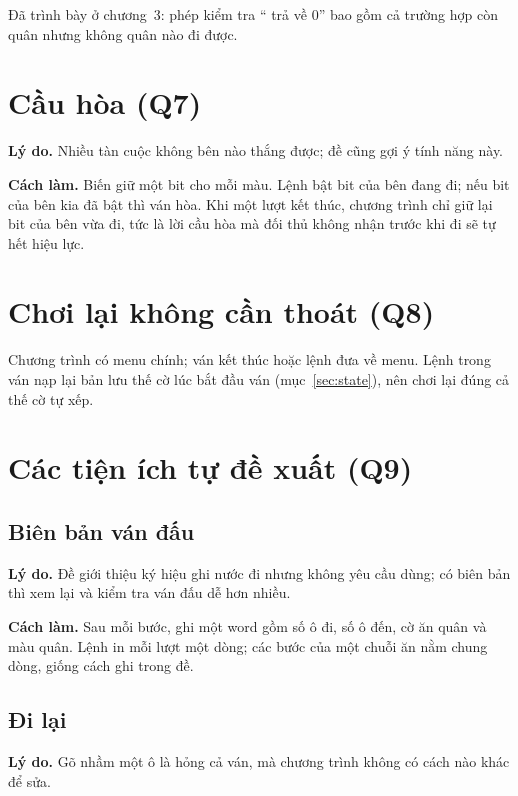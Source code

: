 Đã trình bày ở chương~3: phép kiểm tra `` trả về 0'' bao gồm cả trường hợp còn quân nhưng không quân nào đi được.

\section{Cầu hòa (Q7)}

\textbf{Lý do.} Nhiều tàn cuộc không bên nào thắng được; đề cũng gợi ý tính năng này.

\textbf{Cách làm.} Biến  giữ một bit cho mỗi màu. Lệnh  bật bit của bên đang đi; nếu bit của bên kia đã bật thì ván hòa. Khi một lượt kết thúc, chương trình chỉ giữ lại bit của bên vừa đi, tức là lời cầu hòa mà đối thủ không nhận trước khi đi sẽ tự hết hiệu lực.

\section{Chơi lại không cần thoát (Q8)}

Chương trình có menu chính; ván kết thúc hoặc lệnh  đưa về menu. Lệnh  trong ván nạp lại bản lưu thế cờ lúc bắt đầu ván (mục~\ref{sec:state}), nên chơi lại đúng cả thế cờ tự xếp.

\section{Các tiện ích tự đề xuất (Q9)}

\subsection{Biên bản ván đấu}

\textbf{Lý do.} Đề giới thiệu ký hiệu ghi nước đi nhưng không yêu cầu dùng; có biên bản thì xem lại và kiểm tra ván đấu dễ hơn nhiều.

\textbf{Cách làm.} Sau mỗi bước,  ghi một word gồm số ô đi, số ô đến, cờ ăn quân và màu quân. Lệnh  in mỗi lượt một dòng; các bước của một chuỗi ăn nằm chung dòng, giống cách ghi  trong đề.

\subsection{Đi lại}

\textbf{Lý do.} Gõ nhầm một ô là hỏng cả ván, mà chương trình không có cách nào khác để sửa.

